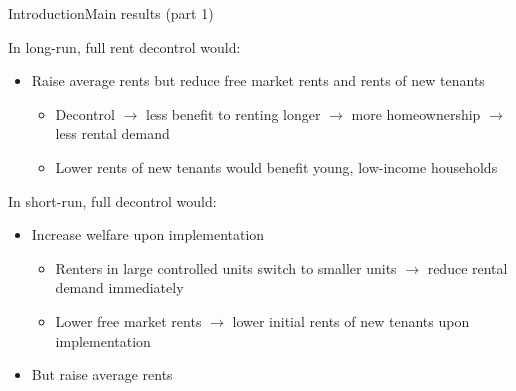 \documentclass[11pt,aspectratio=169]{beamer}
\begin{document}
\begin{frame}{Introduction}{Main results (part 1)}

In long-run, full rent decontrol would:

\begin{itemize}
    \item Raise average rents but reduce free market rents and rents of new tenants
    \begin{itemize}
        \item Decontrol $\rightarrow$ less benefit to renting longer $\rightarrow$ more homeownership $\rightarrow$ less rental demand
        \item Lower rents of new tenants would benefit young, low-income households 
    \end{itemize}
\end{itemize}

\vspace{0.5cm}

In short-run, full decontrol would:

\begin{itemize}
    \item Increase welfare upon implementation
    \begin{itemize}
        \item Renters in large controlled units switch to smaller units $\rightarrow$ reduce rental demand immediately
        \item Lower free market rents $\rightarrow$ lower initial rents of new tenants upon implementation
    \end{itemize}
    \item But raise average rents
\end{itemize}

\end{frame}
\end{document}
